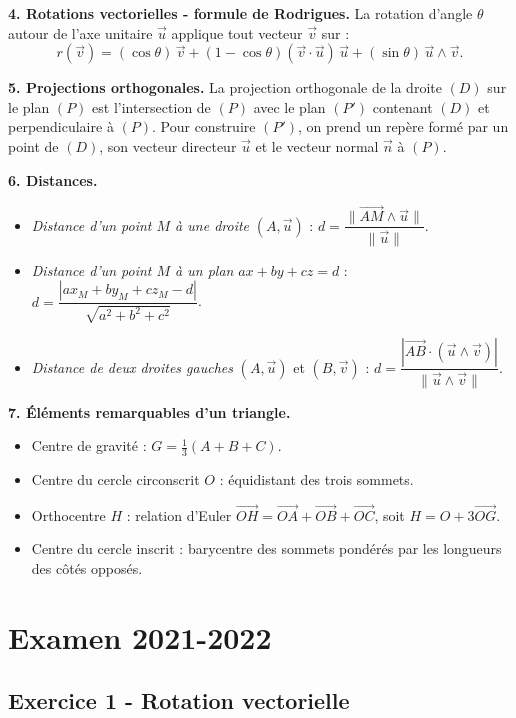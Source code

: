 \documentclass[12pt,a4paper]{article}
\begin{document}
\begin{boiteresume}
\textbf{4. Rotations vectorielles - formule de Rodrigues.}
La rotation d'angle $\theta$ autour de l'axe unitaire $\vec{u}$ applique tout vecteur $\vec{v}$ sur :
\[
  r(\vec{v}) = (\cos\theta)\,\vec{v} + (1-\cos\theta)(\vec{v}\cdot\vec{u})\,\vec{u}
               + (\sin\theta)\,\vec{u}\wedge\vec{v}.
\]

\textbf{5. Projections orthogonales.}
La projection orthogonale de la droite $(D)$ sur le plan $(P)$ est l'intersection de $(P)$ avec le
plan $(P')$ contenant $(D)$ et perpendiculaire à $(P)$. Pour construire $(P')$, on prend un repère
formé par un point de $(D)$, son vecteur directeur $\vec{u}$ et le vecteur normal $\vec{n}$ à $(P)$.

\textbf{6. Distances.}
\begin{itemize}[nosep]
  \item \textit{Distance d'un point $M$ à une droite} $(A,\vec{u})$ :
    $d = \dfrac{\|\overrightarrow{AM}\wedge\vec{u}\|}{\|\vec{u}\|}$.
  \item \textit{Distance d'un point $M$ à un plan} $ax+by+cz=d$ :
    $d = \dfrac{|ax_M+by_M+cz_M-d|}{\sqrt{a^2+b^2+c^2}}$.
  \item \textit{Distance de deux droites gauches} $(A,\vec{u})$ et $(B,\vec{v})$ :
    $d = \dfrac{|\overrightarrow{AB}\cdot(\vec{u}\wedge\vec{v})|}{\|\vec{u}\wedge\vec{v}\|}$.
\end{itemize}

\textbf{7. Éléments remarquables d'un triangle.}
\begin{itemize}[nosep]
  \item Centre de gravité : $G = \tfrac{1}{3}(A+B+C)$.
  \item Centre du cercle circonscrit $O$ : équidistant des trois sommets.
  \item Orthocentre $H$ : relation d'Euler
    $\overrightarrow{OH} = \overrightarrow{OA}+\overrightarrow{OB}+\overrightarrow{OC}$,
    soit $H = O+3\overrightarrow{OG}$.
  \item Centre du cercle inscrit : barycentre des sommets pondérés par les longueurs des côtés opposés.
\end{itemize}

\end{boiteresume}

\newpage
\section{Examen 2021-2022}

\subsection*{Exercice 1 - Rotation vectorielle \niveau{\difficile}}
\end{document}
